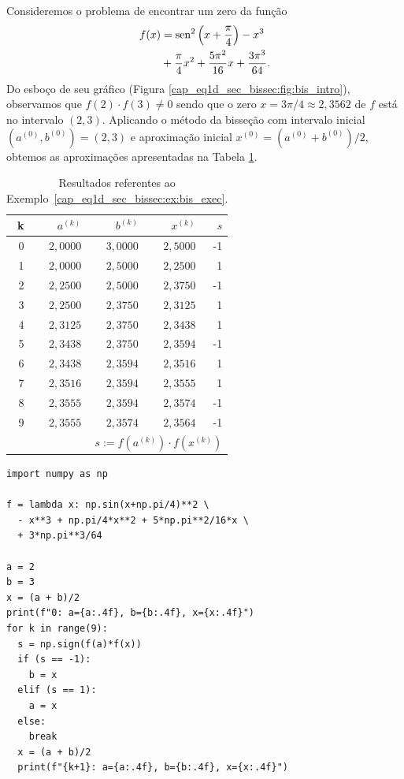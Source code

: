 \begin{ex}\label{cap_eq1d_sec_bissec:ex:bis_exec}
  Consideremos o problema de encontrar um zero da função
  \begin{equation}
    \begin{aligned}
      f(x) &= \operatorname{sen}^2\left(x+\frac{\pi}{4}\right) - x^3 \\
           &+ \frac{\pi}{4}x^2 + \frac{5\pi^2}{16}x + \frac{3\pi^3}{64}.
    \end{aligned}
\end{equation}
Do esboço de seu gráfico (Figura \ref{cap_eq1d_sec_bissec:fig:bis_intro}), observamos que $f(2)\cdot f(3) \neq 0$ sendo que o zero $x=3\pi/4\approx 2,3562$ de $f$ está no intervalo $(2, 3)$. Aplicando o método da bisseção com intervalo inicial $(a^{(0)}, b^{(0)}) = (2, 3)$ e aproximação inicial $x^{(0)} = (a^{(0)}+b^{(0)})/2$, obtemos as aproximações apresentadas na Tabela \ref{cap_eq1d_sec_bissec:tab:bis_exec}.

\begin{table}[h!]
  \centering
  \caption{Resultados referentes ao Exemplo~\ref{cap_eq1d_sec_bissec:ex:bis_exec}.}
  \begin{tabular}{r|rr|r|r}
    k & $a^{(k)}$ & $b^{(k)}$ & $x^{(k)}$ & $s$ \\\hline
    0 & $2,0000$ & $3,0000$ & $2,5000$ & -1 \\
    1 & $2,0000$ & $2,5000$ & $2,2500$ &  1 \\
    2 & $2,2500$ & $2,5000$ & $2,3750$ & -1 \\
    3 & $2,2500$ & $2,3750$ & $2,3125$ & 1 \\
    4 & $2,3125$ & $2,3750$ & $2,3438$ & 1 \\
    5 & $2,3438$ & $2,3750$ & $2,3594$ &  -1 \\
    6 & $2,3438$ & $2,3594$ & $2,3516$ & 1 \\
    7 & $2,3516$ & $2,3594$ & $2,3555$ &  1 \\
    8 & $2,3555$ & $2,3594$ & $2,3574$ &  -1 \\
    9 & $2,3555$ & $2,3574$ & $2,3564$ & -1 \\\hline
    \multicolumn{5}{r}{\small $s := f(a^{(k)})\cdot f(x^{(k)})$}
  \end{tabular}
  \label{cap_eq1d_sec_bissec:tab:bis_exec}
\end{table}

\begin{lstlisting}
import numpy as np

f = lambda x: np.sin(x+np.pi/4)**2 \
  - x**3 + np.pi/4*x**2 + 5*np.pi**2/16*x \
  + 3*np.pi**3/64

a = 2
b = 3
x = (a + b)/2
print(f"0: a={a:.4f}, b={b:.4f}, x={x:.4f}")
for k in range(9):
  s = np.sign(f(a)*f(x))
  if (s == -1):
    b = x
  elif (s == 1):
    a = x
  else:
    break
  x = (a + b)/2
  print(f"{k+1}: a={a:.4f}, b={b:.4f}, x={x:.4f}")
\end{lstlisting}

\end{ex}

